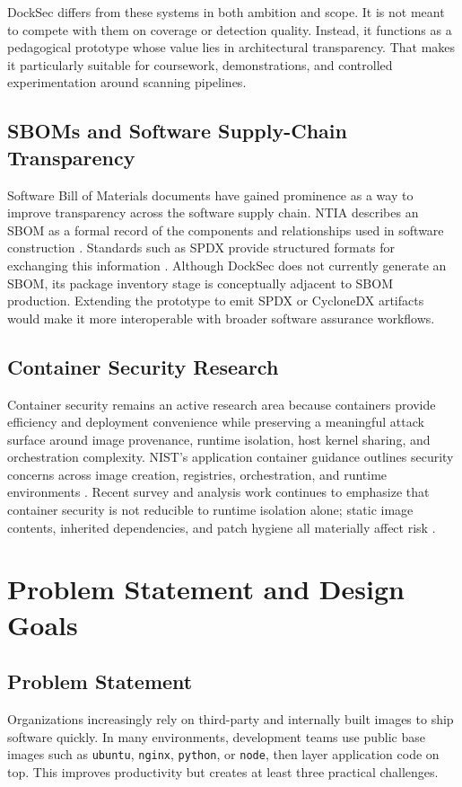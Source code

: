 \documentclass[12pt,draftclsnofoot,onecolumn]{IEEEtran}
\begin{document}
DockSec differs from these systems in both ambition and scope. It is not meant to compete with them on coverage or detection quality. Instead, it functions as a pedagogical prototype whose value lies in architectural transparency. That makes it particularly suitable for coursework, demonstrations, and controlled experimentation around scanning pipelines.

\subsection{SBOMs and Software Supply-Chain Transparency}
Software Bill of Materials documents have gained prominence as a way to improve transparency across the software supply chain. NTIA describes an SBOM as a formal record of the components and relationships used in software construction \cite{ntiasbom}. Standards such as SPDX provide structured formats for exchanging this information \cite{spdxoverview,spdxspec}. Although DockSec does not currently generate an SBOM, its package inventory stage is conceptually adjacent to SBOM production. Extending the prototype to emit SPDX or CycloneDX artifacts would make it more interoperable with broader software assurance workflows.

\subsection{Container Security Research}
Container security remains an active research area because containers provide efficiency and deployment convenience while preserving a meaningful attack surface around image provenance, runtime isolation, host kernel sharing, and orchestration complexity. NIST's application container guidance outlines security concerns across image creation, registries, orchestration, and runtime environments \cite{nist800190}. Recent survey and analysis work continues to emphasize that container security is not reducible to runtime isolation alone; static image contents, inherited dependencies, and patch hygiene all materially affect risk \cite{wong2021survey,ajith2024docker}.

\section{Problem Statement and Design Goals}
\subsection{Problem Statement}
Organizations increasingly rely on third-party and internally built images to ship software quickly. In many environments, development teams use public base images such as \texttt{ubuntu}, \texttt{nginx}, \texttt{python}, or \texttt{node}, then layer application code on top. This improves productivity but creates at least three practical challenges.
\end{document}

